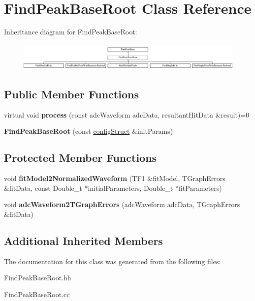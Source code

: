 \hypertarget{class_find_peak_base_root}{}\section{Find\+Peak\+Base\+Root Class Reference}
\label{class_find_peak_base_root}
Inheritance diagram for Find\+Peak\+Base\+Root\+:\begin{figure}[H]
\begin{center}
\leavevmode
\includegraphics[height=1.435897cm]{class_find_peak_base_root}
\end{center}
\end{figure}
\subsection*{Public Member Functions}
\begin{DoxyCompactItemize}
\item 
\hypertarget{class_find_peak_base_root_a1fbcb56012580740749309aa8d51d6ae}{}virtual void {\bfseries process} (const adc\+Waveform adc\+Data, resultant\+Hit\+Data \&result)=0\label{class_find_peak_base_root_a1fbcb56012580740749309aa8d51d6ae}

\item 
\hypertarget{class_find_peak_base_root_a10c62343b210464b163cc54fc1ef4a6b}{}{\bfseries Find\+Peak\+Base\+Root} (const \hyperlink{structconfig_struct}{config\+Struct} \&init\+Params)\label{class_find_peak_base_root_a10c62343b210464b163cc54fc1ef4a6b}

\end{DoxyCompactItemize}
\subsection*{Protected Member Functions}
\begin{DoxyCompactItemize}
\item 
\hypertarget{class_find_peak_base_root_aabc241ad84eb6945c86a47aad9f19e99}{}void {\bfseries fit\+Model2\+Normalized\+Waveform} (T\+F1 \&fit\+Model, T\+Graph\+Errors \&fit\+Data, const Double\+\_\+t $\ast$initial\+Parameters, Double\+\_\+t $\ast$fit\+Parameters)\label{class_find_peak_base_root_aabc241ad84eb6945c86a47aad9f19e99}

\item 
\hypertarget{class_find_peak_base_root_aaa4f0593f5a30f1f4c91b9325f3a24ac}{}void {\bfseries adc\+Waveform2\+T\+Graph\+Errors} (adc\+Waveform adc\+Data, T\+Graph\+Errors \&fit\+Data)\label{class_find_peak_base_root_aaa4f0593f5a30f1f4c91b9325f3a24ac}

\end{DoxyCompactItemize}
\subsection*{Additional Inherited Members}


The documentation for this class was generated from the following files\+:\begin{DoxyCompactItemize}
\item 
Find\+Peak\+Base\+Root.\+hh\item 
Find\+Peak\+Base\+Root.\+cc\end{DoxyCompactItemize}

